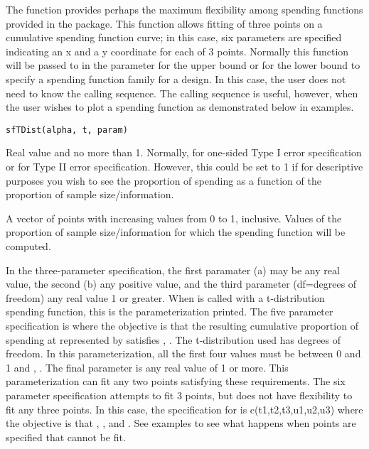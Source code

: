 \begin{Description}\relax
The function  provides perhaps the maximum flexibility among spending functions
provided in the  package.
This function allows fitting of three points on a cumulative spending function curve; in this case, six parameters
are specified indicating an x and a y coordinate for each of 3 points.
Normally this function will be passed to  in the parameter 
 for the upper bound or
 for the lower bound to specify a spending function family for a design.
In this case, the user does not need to know the calling sequence.
The calling sequence is useful, however, when the user wishes to plot a spending function as demonstrated below
in examples.
\end{Description}
\begin{Usage}
\begin{verbatim}
sfTDist(alpha, t, param)
\end{verbatim}
\end{Usage}
\begin{Arguments}
\begin{ldescription}
\item[\code{alpha}] Real value  and no more than 1. Normally, 
 for one-sided Type I error specification
or  for Type II error specification. However, this could be set to 1 if for descriptive purposes
you wish to see the proportion of spending as a function of the proportion of sample size/information.
\item[\code{t}] A vector of points with increasing values from 0 to 1, inclusive. Values of the proportion of 
sample size/information for which the spending function will be computed.
\item[\code{param}] In the three-parameter specification, the first paramater (a) may be any real value, the second (b) any positive value,
and the third parameter (df=degrees of freedom) any real value 1 or greater. When  is called with a t-distribution
spending function, this is the parameterization printed.
The five parameter specification is 
where the objective is that the resulting cumulative proportion of spending at  represented by  satisfies
, . The t-distribution used has  degrees of freedom.
In this parameterization, all the first four values must be between 0 and 1 and , .
The final parameter is any real value of 1 or more. This parameterization can fit any two points satisfying these requirements.
The six parameter specification attempts to fit 3 points, but does not have flexibility to fit any three points.
In this case, the specification for  is c(t1,t2,t3,u1,u2,u3) where the objective is that ,
, and .
See examples to see what happens when points are specified that cannot be fit.
\end{ldescription}
\end{Arguments}
